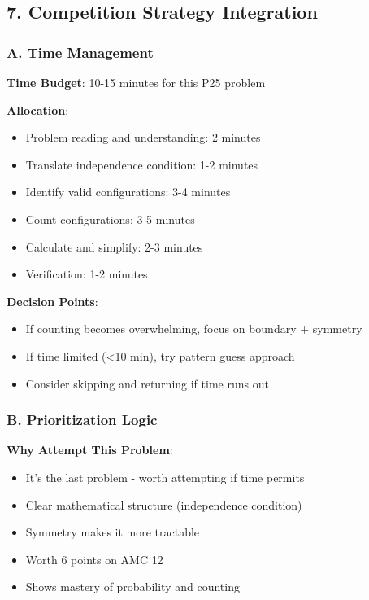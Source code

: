 \documentclass[12pt]{article}
\begin{document}
\begin{competitionbox}
\subsection*{7. Competition Strategy Integration}

\subsubsection*{A. Time Management}

\textbf{Time Budget}: 10-15 minutes for this P25 problem

\textbf{Allocation}:
\begin{itemize}
    \item Problem reading and understanding: 2 minutes
    \item Translate independence condition: 1-2 minutes
    \item Identify valid configurations: 3-4 minutes
    \item Count configurations: 3-5 minutes
    \item Calculate and simplify: 2-3 minutes
    \item Verification: 1-2 minutes
\end{itemize}

\textbf{Decision Points}:
\begin{itemize}
    \item If counting becomes overwhelming, focus on boundary + symmetry
    \item If time limited (<10 min), try pattern guess approach
    \item Consider skipping and returning if time runs out
\end{itemize}

\subsubsection*{B. Prioritization Logic}

\textbf{Why Attempt This Problem}:
\begin{itemize}
    \item It's the last problem - worth attempting if time permits
    \item Clear mathematical structure (independence condition)
    \item Symmetry makes it more tractable
    \item Worth 6 points on AMC 12
    \item Shows mastery of probability and counting
\end{itemize}


\end{competitionbox}
\end{document}
